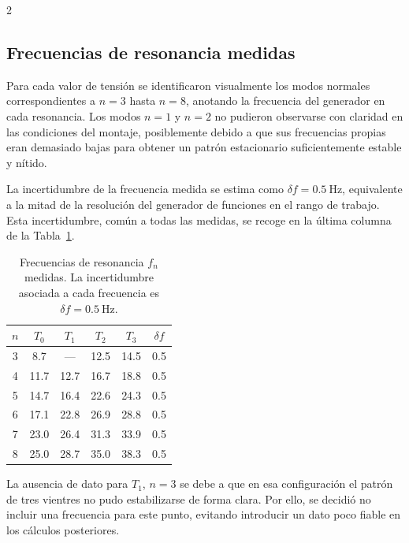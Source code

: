\documentclass[12pt,a4paper]{article}
\begin{document}
\begin{multicols}{2}
\subsection{Frecuencias de resonancia medidas}

Para cada valor de tensión se identificaron visualmente los modos normales correspondientes a $n = 3$ hasta $n = 8$, anotando la frecuencia del generador en cada resonancia. Los modos $n = 1$ y $n = 2$ no pudieron observarse con claridad en las condiciones del montaje, posiblemente debido a que sus frecuencias propias eran demasiado bajas para obtener un patrón estacionario suficientemente estable y nítido.

La incertidumbre de la frecuencia medida se estima como $\delta f = \SI{0.5}{\hertz}$, equivalente a la mitad de la resolución del generador de funciones en el rango de trabajo. Esta incertidumbre, común a todas las medidas, se recoge en la última columna de la Tabla~\ref{tab:frecuencias}.

\begin{table}[H]
  \centering
  \caption{Frecuencias de resonancia $f_n$ medidas. La incertidumbre asociada a cada frecuencia es $\delta f = \SI{0.5}{\hertz}$.}
  \label{tab:frecuencias}
  \vspace{0.3cm}
  \small
  \begin{tabular}{cccccc}
    \toprule
    $n$ & $T_0$ & $T_1$ & $T_2$ & $T_3$ & $\delta f$ \\
    \midrule
    3 & \num{8.7}  & ---          & \num{12.5} & \num{14.5} & \num{0.5} \\
    4 & \num{11.7} & \num{12.7}  & \num{16.7} & \num{18.8} & \num{0.5} \\
    5 & \num{14.7} & \num{16.4}  & \num{22.6} & \num{24.3} & \num{0.5} \\
    6 & \num{17.1} & \num{22.8}  & \num{26.9} & \num{28.8} & \num{0.5} \\
    7 & \num{23.0} & \num{26.4}  & \num{31.3} & \num{33.9} & \num{0.5} \\
    8 & \num{25.0} & \num{28.7}  & \num{35.0} & \num{38.3} & \num{0.5} \\
    \bottomrule
  \end{tabular}
\end{table}

La ausencia de dato para $T_1$, $n=3$ se debe a que en esa configuración el patrón de tres vientres no pudo estabilizarse de forma clara. Por ello, se decidió no incluir una frecuencia para este punto, evitando introducir un dato poco fiable en los cálculos posteriores.


\end{multicols}
\end{document}
